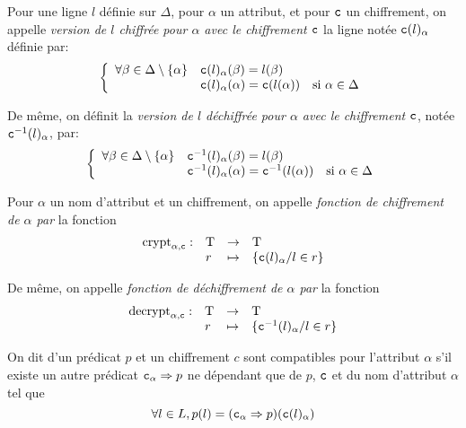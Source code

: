 \begin{defi}
	Pour une ligne $l$ définie sur $\Delta$, pour $\alpha$ un attribut,
	et pour $\text{\ttfamily c}$ un chiffrement,
	on appelle \emph{version de $l$ chiffrée pour $\alpha$ avec le chiffrement
		$\text{\ttfamily c}$}
	la ligne notée $\text{\ttfamily c}(l)_\alpha$ définie par:
	$$
	\left\lbrace
	\begin{array}{lll}
	\forall \beta \in \Delta \setminus \{\alpha\} & \text{\ttfamily c}(l)_\alpha(\beta) = l(\beta) & \\
	& \text{\ttfamily c}(l)_\alpha(\alpha) = \text{\ttfamily c}(l(\alpha)) & \text{si $\alpha \in \Delta$}
	\end{array}
	\right.
	$$
	
	De même, on définit la \emph{version de $l$ déchiffrée pour $\alpha$ avec le chiffrement
		$\text{\ttfamily c}$}, notée $\text{\ttfamily c}^{-1}(l)_\alpha$, par:
	$$
	\left\lbrace
	\begin{array}{lll}
	\forall \beta \in \Delta \setminus \{\alpha\} & \text{\ttfamily c}^{-1}(l)_\alpha(\beta) = l(\beta) & \\
	& \text{\ttfamily c}^{-1}(l)_\alpha(\alpha) = \text{\ttfamily c}^{-1}(l(\alpha)) & \text{si $\alpha \in \Delta$}
	\end{array}
	\right.
	$$
\end{defi}

\begin{defi}
	Pour $\alpha$ un nom d'attribut
	et  un chiffrement,
	on appelle \emph{fonction de chiffrement de $\alpha$ par }
	la fonction
	$$
	\begin{array}{llcl}
	\operatorname{crypt}_{\alpha , \text{\ttfamily c}} : & \operatorname{T} & \rightarrow & \operatorname{T} \\
		&	r	&	\mapsto & \{ \text{\ttfamily c}(l)_\alpha / l \in r \}
	\end{array}
	$$
	
	De même, on appelle \emph{fonction de déchiffrement de $\alpha$ par }
	la fonction
	$$
	\begin{array}{llcl}
	\operatorname{decrypt}_{\alpha , \text{\ttfamily c}} : & \operatorname{T} & \rightarrow & \operatorname{T} \\
	&	r	&	\mapsto & \{ \text{\ttfamily c}^{-1}(l)_\alpha / l \in r \}
	\end{array}
	$$
\end{defi}

\begin{defi}
	On dit d'un prédicat $p$ et un chiffrement $c$ sont compatibles
	pour l'attribut $\alpha$
	s'il existe un autre prédicat $\text{\ttfamily c}_\alpha \Rightarrow p$
	ne dépendant que de $p$, $\text{\ttfamily c}$ et du nom d'attribut $\alpha$ tel que
	$$
	\forall l \in L,
	p(l) = (\text{\ttfamily c}_\alpha \Rightarrow p)(\text{\ttfamily c}(l)_\alpha)
	$$
\end{defi}

